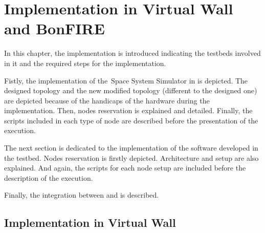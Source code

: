 
\section{Implementation in Virtual Wall and BonFIRE}




In this chapter, the implementation is introduced indicating the testbeds involved in it and the required steps for the implementation.

Fistly, the implementation of the\ Space System
Simulator in \vw is depicted. The designed topology and the new
modified topology (different to the designed one) are depicted because of the handicaps of
the hardware during the implementation. Then, nodes reservation is
explained and detailed. Finally, the scripts included in each type of
node are described before the presentation of the execution.

The next section is dedicated to the implementation of the software
developed in the \bonfire testbed. Nodes reservation is firstly
depicted. Architecture and setup are also explained. And again, the
scripts for each node setup are included before the description of the
execution.

Finally, the integration between \vw and \bonfire is described.






\subsection{Implementation in Virtual Wall}

